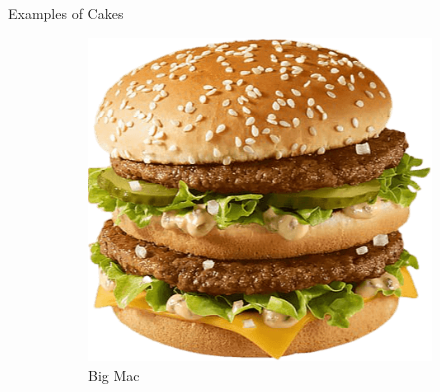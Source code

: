 \documentclass{beamer}
\begin{document}
\begin{frame}{Examples of Cakes}
    \begin{figure}
        \begin{subfigure}{.35\textwidth}
          \centering
          \includegraphics[width=\linewidth]{images/cube_rule_of_food/cake/33_big_mac.png}
          \caption{\label{fig:big-mac}Big Mac\texttrademark}
        \end{subfigure}
        \begin{subfigure}{.35\textwidth}
          \centering

\end{subfigure}
\end{figure}
\end{frame}
\end{document}
